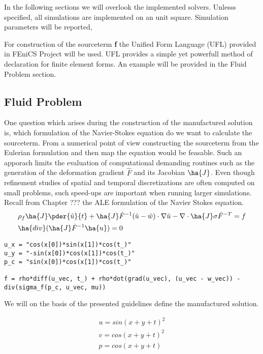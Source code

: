 In the following sections we will overlook the implemented solvers. Unlesss specified, all simulations are implemented on an unit square. Simulation parameters will be reported, 

For construction of the sourceterm \textbf{f} the Unified Form Language (UFL) \cite{Project2016} provided in FEniCS Project will be used. UFL provides a simple yet powerfull method of declaration for finite element forms. An example will be provided in the Fluid Problem section. 

\subsection{Fluid Problem}
One question which arises during the construction of the manufactured solution is, which formulation of the Navier-Stokes equation do we want to calculate the sourceterm. From a numerical point of view constructing the sourceterm from the Eulerian formulation and then map the equation would be feasable. Such an apporach limits the evaluation of computational demanding routines such as the generation of the deformation gradient $\hat{F}$ and its Jacobian $\ha{J}$. Even though refinement studies of spatial and temporal discretizations are often computed on small problems, such speed-ups are important when running larger simulations. 
Recall from Chapter ??? the ALE formulation of the Navier Stokes equation. 
\begin{align*}
&\rho_f \ha{J}\pder{\hat{u}}{t} + \ha{J} \hat{F}^{-1} (\hat{u} - \hat{w})\cdot \nabla \hat{u} 
- \nabla \cdot \ha{J} \sigma \hat{F}^{-T} = f \\
&\ha{div}(\ha{J}\hat{F}^{-1}\ha{u}) = 0
\end{align*}


\begin{lstlisting}[style=python, caption={Descriptive Caption Text}, label=DescriptiveLabel, frame=single]
u_x = "cos(x[0])*sin(x[1])*cos(t_)"
u_y = "-sin(x[0])*cos(x[1])*cos(t_)"
p_c = "sin(x[0])*cos(x[1])*cos(t_)"

f = rho*diff(u_vec, t_) + rho*dot(grad(u_vec), (u_vec - w_vec)) -
div(sigma_f(p_c, u_vec, mu))
\end{lstlisting}

We will on the basis of the presented guidelines define the manufactured solution.

\begin{align*}
u = sin(x + y + t)^2 \\
v = cos(x + y +  t)^2 \\
p = cos(x + y + t)
\end{align*}

